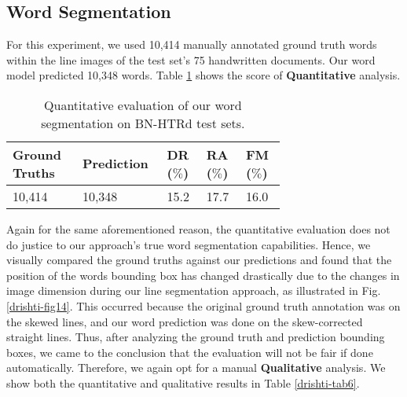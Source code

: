 \documentclass[runningheads]{llncs}
\begin{document}
\subsection{Word Segmentation} 
For this experiment, we used 10,414 manually annotated ground truth words within the line images of the test set's 75 handwritten documents. Our word model predicted 10,348 words. Table \ref{drishti-tab5} shows the score of \textbf{Quantitative} analysis.

\begin{table}[h]
\vspace{-4mm}
\centering
\caption{Quantitative evaluation of our word segmentation on BN-HTRd test sets.}\label{drishti-tab5}
\vspace{-1mm}
\begin{tabular}{|p{0.21\linewidth}|p{0.15\linewidth}|p{0.11\linewidth}| p{0.11\linewidth}| p{0.11\linewidth}|}
\hline
\textbf{Ground Truths} & \textbf{Prediction} & \textbf{DR ($\%$)} & \textbf{RA ($\%$)} & \textbf{FM ($\%$)}\\
\hline
10,414 & 10,348 & 15.2 & 17.7 & 16.0\\
\hline
\end{tabular}
\vspace{-5mm}
\end{table}



\noindent Again for the same aforementioned reason, the quantitative evaluation does not do justice to our approach's true word segmentation capabilities. Hence, we visually compared the ground truths against our predictions and found that the position of the words bounding box has changed drastically due to the changes in image dimension during our line segmentation approach, as illustrated in Fig. \ref{drishti-fig14}. This occurred because the original ground truth annotation was on the skewed lines, and our word prediction was done on the skew-corrected straight lines. Thus, after analyzing the ground truth and prediction bounding boxes, we came to the conclusion that the evaluation will not be fair if done automatically. Therefore, we again opt for a manual \textbf{Qualitative} analysis. We show both the quantitative and qualitative results in Table \ref{drishti-tab6}.
\end{document}
